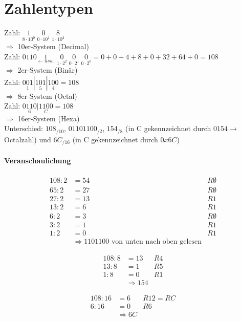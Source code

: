 \section{Zahlentypen}
Zahl: $\underset{8\cdot 10^0}{1} \; \underset{0 \cdot 10^1}{0} \;\underset{1\cdot 10^2}{8}$\\
$\Rightarrow$ 10er-System (Decimal)\\
Zahl: $0110\underset{\leftarrow usw.}{1}\;\underset{1\cdot 2^2}{0}\;\underset{0\cdot 2^1}{0}\;\underset{0\cdot 2^0}{0} = 0 + 0 + 4+8+0+32+64+0 =108$\\
$\Rightarrow$ 2er-System (Binär)\\
Zahl: $\underset{1}{001}|\underset{5}{101}|\underset{4}{100}=108$\\
$\Rightarrow$ 8er-System (Octal)\\
Zahl: $\underset{6}{0110}|\underset{C}{1100}=108$\\
$\Rightarrow$ 16er-System (Hexa)\\
Unterschied: $108_{/10}$, $01101100_{/2}$, $154_{/8}$ (in C gekennzeichnet durch $0154\rightarrow$ Octalzahl) und $6C_{/16}$ (in C gekennzeichnet durch $0x6C$)

\paragraph{Veranschaulichung}
\begin{align*}
108:2&=54 &R \emptyset\\
65:2 &= 27 &R \emptyset\\
27:2&= 13 &R 1\\
13:2 &= 6 &R 1\\
6:2 &=3 &R \emptyset\\
3:2 &= 1 &R 1\\
1:2&= 0 &R 1\\
&\Rightarrow 1101100 \text{ von unten nach oben gelesen}&
\end{align*}

\begin{align*}
108:8 &= 13 &R4\\
13:8 &= 1 &R5\\
1:8 &= 0 &R1\\
&\Rightarrow 154&
\end{align*}

\begin{align*}
108: 16 &= 6 &R12 = RC\\
6:16 &= 0 &R6\\
&\Rightarrow 6C&
\end{align*}

